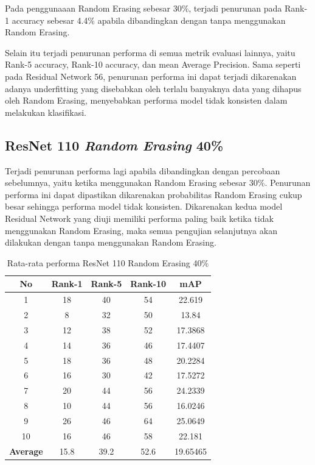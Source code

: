Pada penggunaaan Random Erasing sebesar 30\%, terjadi penurunan pada Rank-1 accuracy sebesar 4.4\% apabila dibandingkan dengan tanpa menggunakan Random Erasing.

Selain itu terjadi penurunan performa di semua metrik evaluasi lainnya, yaitu Rank-5 accuracy, Rank-10 accuracy, dan mean Average Precision. Sama seperti pada Residual Network 56, penurunan performa ini dapat terjadi dikarenakan adanya underfitting yang disebabkan oleh terlalu banyaknya data yang dihapus oleh Random Erasing, menyebabkan performa model tidak konsisten dalam melakukan klasifikasi.

\subsection{ResNet 110 \textit{Random Erasing} 40\%}

Terjadi penurunan performa lagi apabila dibandingkan dengan percobaan sebelumnya, yaitu ketika menggunakan Random Erasing sebesar 30\%. Penurunan performa ini dapat dipastikan dikarenakan probabilitas Random Erasing cukup besar sehingga performa model tidak konsisten. Dikarenakan kedua model Residual Network yang diuji memiliki performa paling baik ketika tidak menggunakan Random Erasing, maka semua pengujian selanjutnya akan dilakukan dengan tanpa menggunakan Random Erasing.

\begin{longtable}{|c|c|c|c|c|}
	\caption{Rata-rata performa ResNet 110 Random Erasing 40\%}
	\label{tabel: 34}\\
	\hline
	\rowcolor[HTML]{C0C0C0}
	\textbf{No} &\textbf{Rank-1} & \textbf{Rank-5} & \textbf{Rank-10} & \textbf{mAP} \\
	\hline
	1 &18 &40 &54 &22.619 \\
	2 &8 &32 &50 &13.84 \\
	3 &12 &38 &52 &17.3868 \\
	4 &14 &36 &46 &17.4407 \\
	5 &18 &36 &48 &20.2284 \\
	6 &16 &30 &42 &17.5272 \\
	7 &20 &44 &56 &24.2339 \\
	8 &10 &44 &56 &16.0246 \\
	9 &26 &46 &64 &25.0649 \\
	10 &16 &46 &58 &22.181 \\
	\hline
	\textbf{Average} & 15.8 & 39.2 & 52.6 &19.65465 \\
	\hline
\end{longtable}

